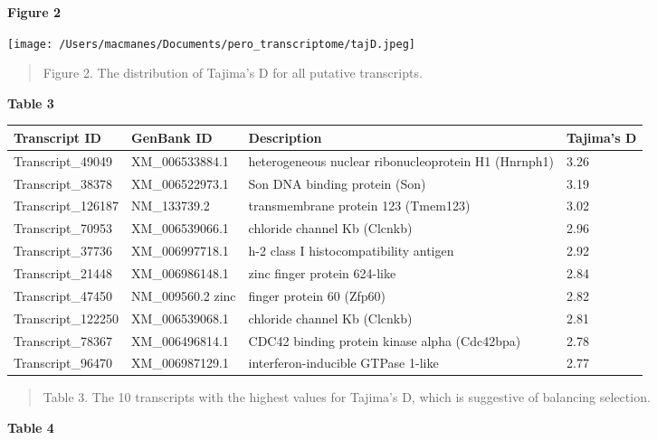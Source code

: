 \documentclass[11pt]{article}
\begin{document}
\textbf{\hypertarget{Figure 2}{Figure 2}} \\
\centerline{\texttt{[image: /Users/macmanes/Documents/pero\_transcriptome/tajD.jpeg]}}
\begin{quote}
\small{Figure 2. The distribution of Tajima's D for all putative transcripts.}
\end{quote}  
\vspace{10mm}
\textbf{\hypertarget{Table 3}{Table 3}} \\
\begin{center}
\begin{adjustwidth}{-.75in}{-.75in}%
\begin{tabular}{ l l l l }
\textbf{Transcript ID} & \textbf{GenBank ID} & \textbf{Description} & \textbf{Tajima's D}\\
\hline
Transcript\_49049 & XM\_006533884.1 & heterogeneous nuclear ribonucleoprotein H1 (Hnrnph1) & 3.26\\
Transcript\_38378 & XM\_006522973.1 & Son DNA binding protein (Son) & 3.19\\
Transcript\_126187 & NM\_133739.2 & transmembrane protein 123 (Tmem123) & 3.02\\
Transcript\_70953 & XM\_006539066.1 & chloride channel Kb (Clcnkb) & 2.96 \\
Transcript\_37736 & XM\_006997718.1 & h-2 class I histocompatibility antigen & 2.92 \\
Transcript\_21448 & XM\_006986148.1 & zinc finger protein 624-like & 2.84\\
Transcript\_47450 & NM\_009560.2 zinc & finger protein 60 (Zfp60) & 2.82\\
Transcript\_122250 & XM\_006539068.1 & chloride channel Kb (Clcnkb) & 2.81\\
Transcript\_78367 & XM\_006496814.1 & CDC42 binding protein kinase alpha (Cdc42bpa) & 2.78 \\
Transcript\_96470 & XM\_006987129.1 & interferon-inducible GTPase 1-like & 2.77 \\
 \end{tabular}
\begin{quote}
\small{Table 3. The 10 transcripts with the highest values for Tajima's D, which is suggestive of balancing selection.}
\end{quote}  
\end{adjustwidth}
\end{center}
\vspace{10mm}
\textbf{\hypertarget{Table 4}{Table 4}} \\
\end{document}
